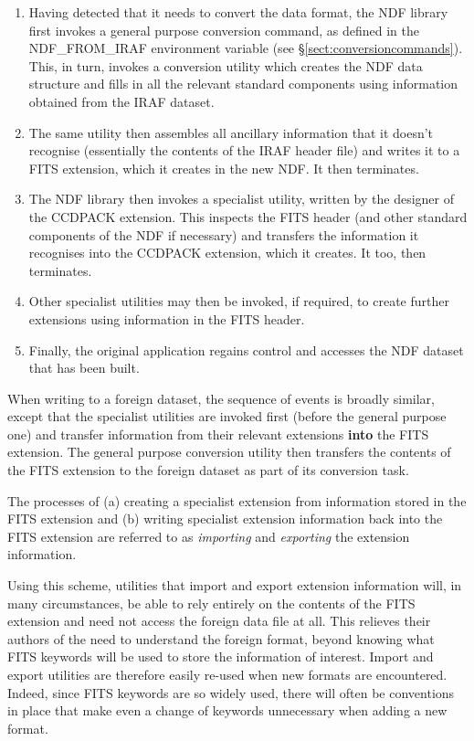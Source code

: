\documentclass[11pt,twoside,nolof]{starlink}
\providecommand{\st}[1]{{\em{#1}}}
\begin{document}
\begin{enumerate}
\item Having detected that it needs to convert the data format, the
NDF library first invokes a general purpose conversion command, as
defined in the NDF\_FROM\_IRAF environment variable (see
\S\ref{sect:conversioncommands}). This, in turn, invokes a conversion
utility which creates the NDF data structure and fills in all the
relevant standard components using information obtained from the IRAF
dataset.

\item The same utility then assembles all ancillary information that
it doesn't recognise (essentially the contents of the IRAF header
file) and writes it to a FITS extension, which it creates in the new
NDF. It then terminates.

\item The NDF library then invokes a specialist utility, written by
the designer of the CCDPACK extension. This inspects the FITS header
(and other standard components of the NDF if necessary) and transfers
the information it recognises into the CCDPACK extension, which it
creates. It too, then terminates.

\item Other specialist utilities may then be invoked, if required, to
create further extensions using information in the FITS header.

\item Finally, the original application regains control and accesses
the NDF dataset that has been built.
\end{enumerate}

When writing to a foreign dataset, the sequence of events is broadly
similar, except that the specialist utilities are invoked first
(before the general purpose one) and transfer information from their
relevant extensions \textbf{into} the FITS extension. The general purpose
conversion utility then transfers the contents of the FITS extension
to the foreign dataset as part of its conversion task.

The processes of (a) creating a specialist extension from information
stored in the FITS extension and (b) writing specialist extension
information back into the FITS extension are referred to as
\st{importing} and \st{exporting} the extension information.

Using this scheme, utilities that import and export extension
information will, in many circumstances, be able to rely entirely on
the contents of the FITS extension and need not access the foreign
data file at all. This relieves their authors of the need to
understand the foreign format, beyond knowing what FITS keywords will
be used to store the information of interest.  Import and export
utilities are therefore easily re-used when new formats are
encountered.  Indeed, since FITS keywords are so widely used, there
will often be conventions in place that make even a change of keywords
unnecessary when adding a new format.
\end{document}
